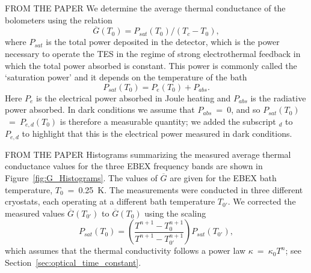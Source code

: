 

FROM THE PAPER
We determine the average thermal conductance of the bolometers using the relation
\begin{equation}
 \overline{G}(T_{0}) = P_{sat}(T_0)/ (T_{c} - T_{0}),
\label{eqn:gbar}
\end{equation}
where $P_{sat}$ is the total power deposited in the detector, which is the power necessary to operate the \ac{TES} in the regime of strong electrothermal feedback in which the total power absorbed is constant.
This power is commonly called the `saturation power' and it depends on the temperature of the bath
\begin{equation}
P_{sat}(T_{0}) = P_{e} (T_{0}) + P_{abs}. 
\label{eqn:boloPowerFlow}
\end{equation}
Here $P_{e}$ is the electrical power absorbed in Joule heating and $P_{abs}$ is the radiative power absorbed.
In dark conditions we assume that $P_{abs}$~=~0, and so $P_{sat}(T_{0})$~=~$P_{e,d}(T_{0})$ is 
therefore a measurable quantity; we added the subscript $_{d}$ to $P_{e,d}$ to highlight that this is the electrical 
power measured in dark conditions. 

FROM THE PAPER
Histograms summarizing the measured average thermal conductance values for the three \ac{EBEX} frequency bands are shown in 
Figure~\ref{fig:G_Histograms}. The values of  $\overline{G}$ are given for the \ac{EBEX} bath temperature, $T_{0}$~=~0.25~K.
The measurements were conducted in three different cryostats, each operating at 
a different bath temperature $T_{0'}$. We corrected the measured values $\overline{G}(T_{0'})$ to $\overline{G}(T_{0})$ using 
the scaling
\begin{equation}
P_{sat}(T_0) = \left( \frac{T^{n+1}-T_0^{n+1}}{T^{n+1}-T_{0'}^{n+1}} \right) P_{sat}(T_{0'}),
\label{eqn:ScalePsat}
\end{equation}
which assumes that the thermal conductivity follows a power law $\kappa$~=~$\kappa_{0} T^{n}$; see Section~\ref{sec:optical_time_constant}. 

